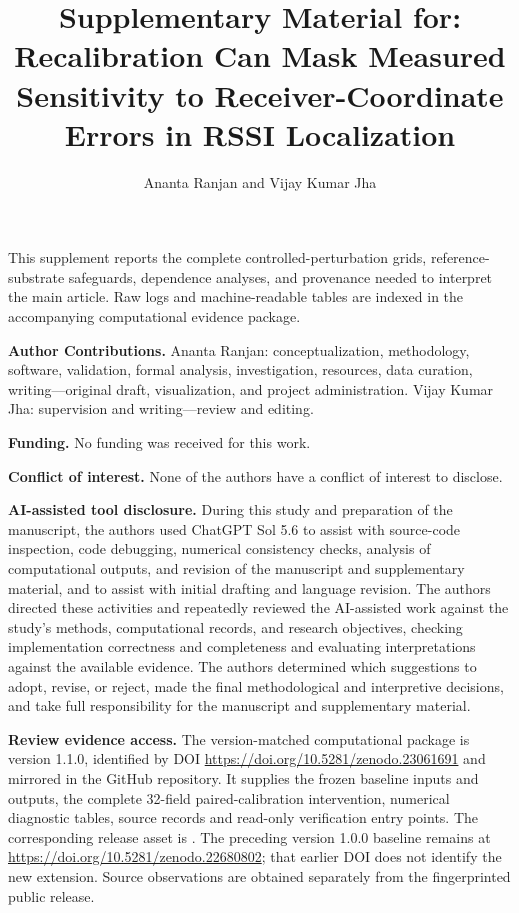 \documentclass[journal,onecolumn,10pt]{IEEEtran}
\begin{document}
\title{Supplementary Material for: Recalibration Can Mask Measured Sensitivity to Receiver-Coordinate Errors in RSSI Localization}
\author{Ananta Ranjan and Vijay Kumar Jha}
\maketitle
This supplement reports the complete controlled-perturbation grids, reference-substrate safeguards, dependence analyses, and provenance needed to interpret the main article. Raw logs and machine-readable tables are indexed in the accompanying computational evidence package. 

\noindent\textbf{Author Contributions.} Ananta Ranjan: conceptualization, methodology, software, validation, formal analysis, investigation, resources, data curation, writing---original draft, visualization, and project administration. Vijay Kumar Jha: supervision and writing---review and editing.

\noindent\textbf{Funding.} No funding was received for this work.

\noindent\textbf{Conflict of interest.} None of the authors have a conflict of interest to disclose.

\noindent\textbf{AI-assisted tool disclosure.} During this study and preparation of the manuscript, the authors used ChatGPT Sol 5.6 to assist with source-code inspection, code debugging, numerical consistency checks, analysis of computational outputs, and revision of the manuscript and supplementary material, and to assist with initial drafting and language revision. The authors directed these activities and repeatedly reviewed the AI-assisted work against the study's methods, computational records, and research objectives, checking implementation correctness and completeness and evaluating interpretations against the available evidence. The authors determined which suggestions to adopt, revise, or reject, made the final methodological and interpretive decisions, and take full responsibility for the manuscript and supplementary material.

\noindent\textbf{Review evidence access.} The version-matched computational package is version 1.1.0, identified by DOI \url{https://doi.org/10.5281/zenodo.23061691} and mirrored in the GitHub repository. It supplies the frozen baseline inputs and outputs, the complete 32-field paired-calibration intervention, numerical diagnostic tables, source records and read-only verification entry points. The corresponding release asset is . The preceding version 1.0.0 baseline remains at \url{https://doi.org/10.5281/zenodo.22680802}; that earlier DOI does not identify the new extension. Source observations are obtained separately from the fingerprinted public release.
\end{document}
